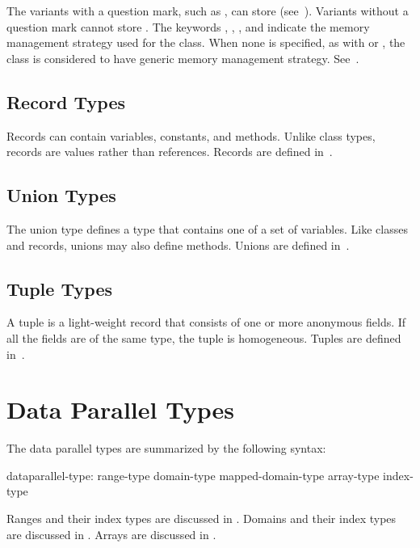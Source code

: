 The variants with a question mark, such as , can store
 (see~). Variants without a question mark
cannot store . The keywords , ,
, and  indicate the memory management
strategy used for the class. When none is specified, as with  or
, the class is considered to have generic memory management
strategy. See~.

\subsection{Record Types}
\label{Types_Record_Types}

Records can contain variables, constants, and methods. Unlike class
types, records are values rather than references. Records are defined
in~.

\subsection{Union Types}
\label{Types_Union_Types}

The union type defines a type that contains one of a set of variables.
Like classes and records, unions may also define methods.  Unions are
defined in~.

\subsection{Tuple Types}
\label{Types_Tuple_Types}

A tuple is a light-weight record that consists of one or more
anonymous fields.  If all the fields are of the same type, the tuple
is homogeneous.  Tuples are defined in~.

\clearpage
\section{Data Parallel Types}
\label{Data_Parallel_Types}

The data parallel types are summarized by the following syntax:

\begin{syntax}
dataparallel-type:
  range-type
  domain-type
  mapped-domain-type
  array-type
  index-type
\end{syntax}

Ranges and their index types are discussed in .
Domains and their index types are discussed in .
Arrays are discussed in .

